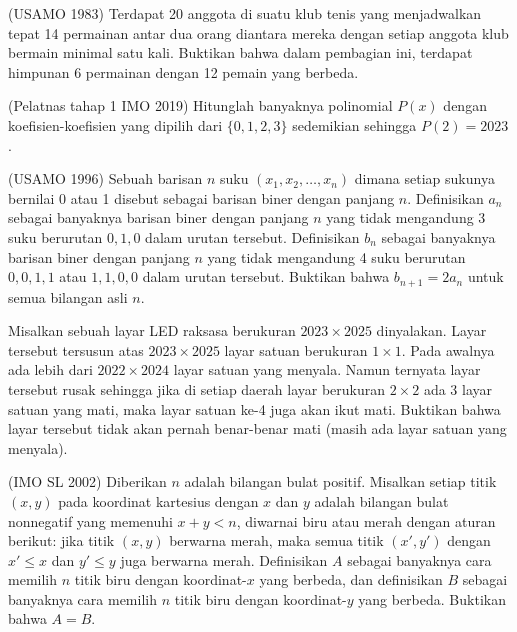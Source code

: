 \documentclass[11pt]{scrartcl}
\begin{document}
\begin{soaljawab}
(USAMO 1983) Terdapat 20 anggota di suatu klub tenis yang menjadwalkan tepat 14 permainan antar dua orang diantara mereka dengan setiap anggota klub bermain minimal satu kali. Buktikan bahwa dalam pembagian ini, terdapat himpunan 6 permainan dengan 12 pemain yang berbeda.
\end{soaljawab}

\begin{soaljawab}
    (Pelatnas tahap 1 IMO 2019) Hitunglah banyaknya polinomial $P(x)$ dengan koefisien-koefisien yang dipilih dari $\{0, 1, 2, 3\}$ sedemikian sehingga $P(2) = 2023$.
\end{soaljawab}

\begin{soaljawab}
    (USAMO 1996) Sebuah barisan $n$ suku $(x_1,x_2,\dots,x_n)$ dimana setiap sukunya bernilai 0 atau 1 disebut sebagai barisan biner dengan panjang $n$. Definisikan $a_n$ sebagai banyaknya barisan biner dengan panjang $n$ yang tidak mengandung 3 suku berurutan $0,1,0$ dalam urutan tersebut. Definisikan $b_n$ sebagai banyaknya barisan biner dengan panjang $n$ yang tidak mengandung 4 suku berurutan $0,0,1,1$ atau $1,1,0,0$  dalam urutan tersebut. Buktikan bahwa $b_{n+1} = 2a_{n}$ untuk semua bilangan asli $n$.
\end{soaljawab}

\begin{soaljawab}
    Misalkan sebuah layar LED raksasa berukuran $2023 \times 2025$ dinyalakan. Layar tersebut tersusun atas $2023 \times 2025$ layar satuan berukuran $1 \times 1$. Pada awalnya ada lebih dari $2022 \times 2024$ layar satuan yang menyala. Namun ternyata layar tersebut rusak sehingga jika di setiap daerah layar berukuran $2 \times 2$ ada 3 layar satuan yang mati, maka layar satuan ke-4 juga akan ikut mati. Buktikan bahwa layar tersebut tidak akan pernah benar-benar mati (masih ada layar satuan yang menyala).
\end{soaljawab}

\begin{soaljawab}
    (IMO SL 2002) Diberikan $n$ adalah bilangan bulat positif. Misalkan setiap titik $(x,y)$ pada koordinat kartesius dengan $x$ dan $y$ adalah bilangan bulat nonnegatif yang memenuhi $x+y < n$, diwarnai biru atau merah dengan aturan berikut: jika titik $(x,y)$ berwarna merah, maka semua titik $(x',y')$ dengan $x' \le x$ dan $y' \le y$ juga berwarna merah. Definisikan $A$ sebagai banyaknya cara memilih $n$ titik biru dengan koordinat-$x$ yang berbeda, dan definisikan $B$ sebagai banyaknya cara memilih $n$ titik biru dengan koordinat-$y$ yang berbeda. Buktikan bahwa $A=B$.
\end{soaljawab}
\end{document}
